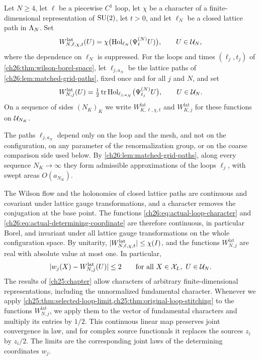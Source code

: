 \begin{definition}\label{ch26:def:actual-loop-coordinates}
Let $N\ge4$, let $\ell$ be a piecewise $C^1$ loop, let $\chi$ be a character of a finite-dimensional representation of $\mathrm{SU}(2)$, let $t>0$, and let $\ell_N$ be a closed lattice path in $\Lambda_{N}$. Set
\begin{equation}\label{ch26:eq:actual-loop-character}
 W^{\mathrm{lat}}_{N,\ell,\chi,t}(U)=\chi\bigl(\operatorname{Hol}_{\ell_N}(\Psi^{(N)}_tU)\bigr),\qquad U\in\mathcal U_{N},
\end{equation}
where the dependence on $\ell_N$ is suppressed. For the loops and times $(\ell_j,t_j)$ of \cref{ch26:thm:wilson-borel-space}, let $\ell_{j,a_N}$ be the lattice paths of \cref{ch26:lem:matched-grid-paths}, fixed once and for all $j$ and $N$, and set
\begin{equation}\label{ch26:eq:actual-determining-coordinate}
 W^{\mathrm{lat}}_{N,j}(U)=\tfrac12\operatorname{tr}\operatorname{Hol}_{\ell_{j,a_N}}\bigl(\Psi^{(N)}_{t_j}U\bigr),\qquad U\in\mathcal U_{N} .
\end{equation}
On a sequence of sides $(N_K)_K$ we write $W^{\mathrm{lat}}_{K,\ell,\chi,t}$ and $W^{\mathrm{lat}}_{K,j}$ for these functions on $\mathcal U_{N_K}$.
\end{definition}

The paths $\ell_{j,a_N}$ depend only on the loop and the mesh, and not on the configuration, on any parameter of the renormalization group, or on the coarse comparison side used below. By \cref{ch26:lem:matched-grid-paths}, along every sequence $N_K\to\infty$ they form admissible approximations of the loops $\ell_j$, with swept areas $O(a_{N_K})$.

The Wilson flow and the holonomies of closed lattice paths are continuous and covariant under lattice gauge transformations, and a character removes the conjugation at the base point. The functions \eqref{ch26:eq:actual-loop-character} and \eqref{ch26:eq:actual-determining-coordinate} are therefore continuous, in particular Borel, and invariant under all lattice gauge transformations on the whole configuration space. By unitarity, $\lvert W^{\mathrm{lat}}_{N,\ell,\chi,t}\rvert\le\chi(I)$, and the functions $W^{\mathrm{lat}}_{N,j}$ are real with absolute value at most one. In particular,
\begin{equation}\label{ch26:eq:normalized-discrepancy-bound}
 \lvert w_j(X)-W^{\mathrm{lat}}_{N,j}(U)\rvert\le2\qquad\text{for all }X\in\mathcal X_L,\ U\in\mathcal U_{N} .
\end{equation}
The results of \cref{ch25:chapter} allow characters of arbitrary finite-dimensional representations, including the unnormalized fundamental character. Whenever we apply \cref{ch25:thm:selected-loop-limit,ch25:thm:original-loop-stitching} to the functions $W^{\mathrm{lat}}_{N,j}$, we apply them to the vector of fundamental characters and multiply its entries by $1/2$. This continuous linear map preserves joint convergence in law, and for complex source functionals it replaces the sources $z_i$ by $z_i/2$. The limits are the corresponding joint laws of the determining coordinates $w_j$.

